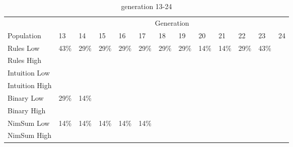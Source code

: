 \begin{table}
	\medskip
	\begin{subtable}{\linewidth}
	\centering
	\caption{generation 13-24}
		\begin{tabular}{l|llllllllllll}\hline
		\multicolumn{1}{l}{} & \multicolumn{12}{c}{Generation} \\
		\multicolumn{1}{l}{Population} & 13 & 14 & 15 & 16 & 17 & 18 & 19 & 20 & 21 & 22 & 23 & 24\\\hline
		Rules Low & 43\% & 29\% & 29\% & 29\% & 29\% & 29\% & 29\% & 14\% & 14\% & 29\% & 43\% & \textemdash \\
		Rules High & \textemdash & \textemdash & \textemdash & \textemdash & \textemdash & \textemdash & \textemdash & \textemdash & \textemdash & \textemdash & \textemdash & \textemdash \\
		Intuition Low & \textemdash & \textemdash & \textemdash & \textemdash & \textemdash & \textemdash & \textemdash & \textemdash & \textemdash & \textemdash & \textemdash & \textemdash \\
		Intuition High & \textemdash & \textemdash & \textemdash & \textemdash & \textemdash & \textemdash & \textemdash & \textemdash & \textemdash & \textemdash & \textemdash & \textemdash \\
		Binary Low & 29\% & 14\% & \textemdash & \textemdash & \textemdash & \textemdash & \textemdash & \textemdash & \textemdash & \textemdash & \textemdash & \textemdash \\
		Binary High & \textemdash & \textemdash & \textemdash & \textemdash & \textemdash & \textemdash & \textemdash & \textemdash & \textemdash & \textemdash & \textemdash & \textemdash \\
		NimSum Low & 14\% & 14\% & 14\% & 14\% & 14\% & \textemdash & \textemdash & \textemdash & \textemdash & \textemdash & \textemdash & \textemdash \\
		NimSum High & \textemdash & \textemdash & \textemdash & \textemdash & \textemdash & \textemdash & \textemdash & \textemdash & \textemdash & \textemdash & \textemdash & \textemdash \\
		\end{tabular}
	\end{subtable}
\end{table}
